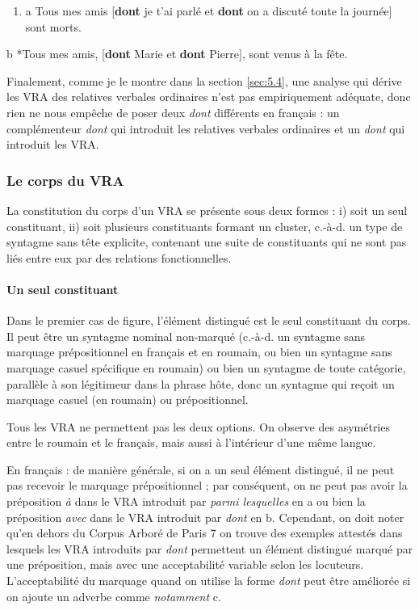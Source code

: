 \begin{enumerate}
\item \label{bkm:Ref294029258}a  Tous mes amis [\textbf{dont} je t'ai parlé et \textbf{dont} on a discuté toute la journée] sont morts.


\end{enumerate}
  b  *Tous mes amis, [\textbf{dont} Marie et \textbf{dont} Pierre], sont venus à la fête.

Finalement, comme je le montre dans la section \ref{sec:5.4}, une analyse qui dérive les VRA des relatives verbales ordinaires n'est pas empiriquement adéquate, donc rien ne nous empêche de poser deux \textit{dont} différents en français : un complémenteur \textit{dont} qui introduit les relatives verbales ordinaires et un \textit{dont} qui introduit les VRA.

\subsubsection{Le corps du VRA} 
\label{bkm:Ref298950479}La constitution du corps d'un VRA se présente sous deux formes : i) soit un seul constituant, ii) soit plusieurs constituants formant un cluster, c.-à-d. un type de syntagme sans tête explicite, contenant une suite de constituants qui ne sont pas liés entre eux par des relations fonctionnelles.

\paragraph[Un seul constituant]{Un seul constituant}
\label{bkm:Ref298953034}Dans le premier cas de figure, l'élément distingué est le seul constituant du corps. Il peut être un syntagme nominal non-marqué (c.-à-d. un syntagme sans marquage prépositionnel en français et en roumain, ou bien un syntagme sans marquage casuel spécifique en roumain) ou bien un syntagme de toute catégorie, parallèle à son légitimeur dans la phrase hôte, donc un syntagme qui reçoit un marquage casuel (en roumain) ou prépositionnel.

Tous les VRA ne permettent pas les deux options. On observe des asymétries entre le roumain et le français, mais aussi à l'intérieur d'une même langue.~

En français : de manière générale, si on a un seul élément distingué, il ne peut pas recevoir le marquage prépositionnel ; par conséquent, on ne peut pas avoir la préposition \textit{à} dans le VRA introduit par \textit{parmi lesquelles} en a ou bien la préposition \textit{avec} dans le VRA introduit par \textit{dont} en b. Cependant, on doit noter qu'en dehors du Corpus Arboré de Paris 7 on trouve des exemples attestés dans lesquels les VRA introduits par \textit{dont} permettent un élément distingué marqué par une préposition, mais avec une acceptabilité variable selon les locuteurs. L'acceptabilité du marquage quand on utilise la forme \textit{dont} peut être améliorée si on ajoute un adverbe comme \textit{notamment} c.


